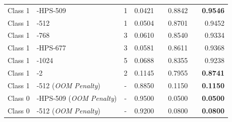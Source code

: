 \begin{table}[htbp]
{\begin{tabular}{llcrc rc r}
\midrule
Class 1 & \ntru{}-HPS-509 & 1 & 0.0421 & & 0.8842 & & \textbf{0.9546} \\
Class 1 & \kyber{}-512 & 1 & 0.0504 & & 0.8701 & & 0.9452 \\
Class 1 & \kyber{}-768 & 3 & 0.0610 & & 0.8540 & & 0.9334 \\
Class 1 & \ntru{}-HPS-677 & 3 & 0.0581 & & 0.8611 & & 0.9368 \\
Class 1 & \kyber{}-1024 & 5 & 0.0688 & & 0.8355 & & 0.9238 \\
Class 1 & \dilithium{}-2 & 2 & 0.1145 & & 0.7955 & & \textbf{0.8741} \\
Class 1 & \falcon{}-512 (\textit{OOM Penalty}) & - & 0.8850 & & 0.1150 & & \textbf{0.1150} \\
\midrule
Class 0 & \ntru{}-HPS-509 (\textit{OOM Penalty}) & - & 0.9500 & & 0.0500 & & \textbf{0.0500} \\
Class 0 & \kyber{}-512 (\textit{OOM Penalty}) & - & 0.9200 & & 0.0800 & & \textbf{0.0800} \\
\bottomrule
\end{tabular}
}
\end{table}


